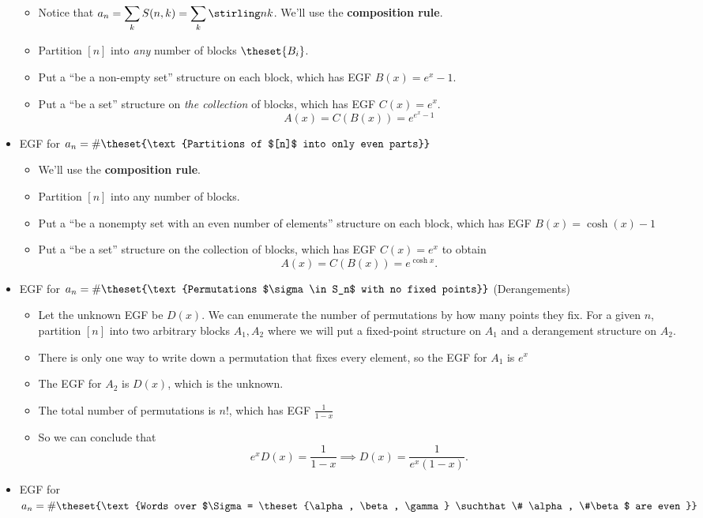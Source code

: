 \begin{itemize}
  \begin{itemize}
  \tightlist
  \item
    Notice that
    \(a_n = \displaystyle\sum_k S(n, k) = \displaystyle\sum_k \stirling n k\).
    We'll use the \textbf{composition rule}.
  \item
    Partition \([n]\) into \emph{any} number of blocks \(\theset{B_i}\).
  \item
    Put a ``be a non-empty set'' structure on each block, which has EGF
    \(B(x) = e^x - 1\).
  \item
    Put a ``be a set'' structure on \emph{the collection} of blocks,
    which has EGF \(C(x) = e^x\). \[
    A(x) = C(B(x)) = e^{e^x - 1}
    \]
  \end{itemize}
\item
  EGF for
  \(a_n = \#\theset{\text{Partitions of $[n]$ into only even parts}}\)

  \begin{itemize}
  \tightlist
  \item
    We'll use the \textbf{composition rule}.
  \item
    Partition \([n]\) into any number of blocks.
  \item
    Put a ``be a nonempty set with an even number of elements''
    structure on each block, which has EGF \(B(x) = \cosh(x) -1\)
  \item
    Put a ``be a set'' structure on the collection of blocks, which has
    EGF \(C(x) = e^x\) to obtain \[
    A(x) = C(B(x)) = e^{\cosh x}.
    \]
  \end{itemize}
\item
  EGF for
  \(a_n = \#\theset{\text{Permutations $\sigma \in S_n$ with no fixed points}}\)
  (Derangements)

  \begin{itemize}
  \tightlist
  \item
    Let the unknown EGF be \(D(x)\). We can enumerate the number of
    permutations by how many points they fix. For a given \(n\),
    partition \([n]\) into two arbitrary blocks \(A_1, A_2\) where we
    will put a fixed-point structure on \(A_1\) and a derangement
    structure on \(A_2\).
  \item
    There is only one way to write down a permutation that fixes every
    element, so the EGF for \(A_1\) is \(e^x\)
  \item
    The EGF for \(A_2\) is \(D(x)\), which is the unknown.
  \item
    The total number of permutations is \(n!\), which has EGF
    \(\frac 1 {1-x}\)
  \item
    So we can conclude that
    \[e^x D(x) = \frac{1}{1-x} \implies D(x) = \frac{1}{e^x(1-x)}.\]
  \end{itemize}
\item
  EGF for
  \(a_n = \#\theset{\text{Words over $\Sigma = \theset{\alpha, \beta, \gamma} \suchthat \# \alpha, \#\beta$ are even }}\)


\end{itemize}
